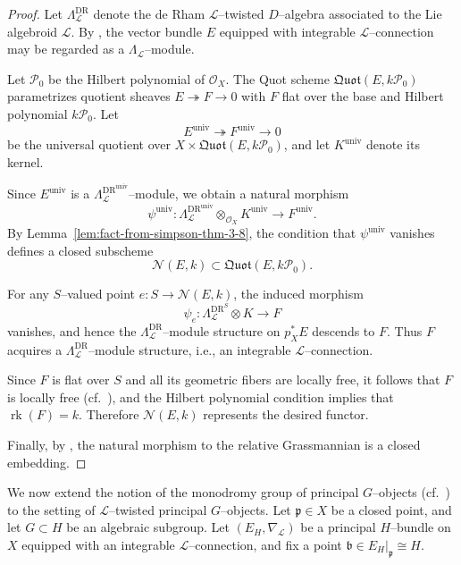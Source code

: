 \documentclass[12pt,reqno]{amsart}
\numberwithin{equation}{subsection}
\theoremstyle{definition}
\theoremstyle{theorem}
\begin{document}
\begin{proof}
	Let $\Lambda^{\text{DR}}_{\mathcal L}$ denote the de Rham $\mathcal{L}$--twisted $D$--algebra associated to the Lie algebroid
	$\mathcal L$.
	By \cite[\S\, Ch.4. Prop. 38]{P.Tortella-2011T},
	the vector bundle $E$ equipped with integrable $\mathcal{L}$--connection may be regarded as a $\Lambda_{\mathcal L}$--module.
	
	Let $\mathcal P_0$ be the Hilbert polynomial of $\mathcal O_X$.
	The Quot scheme $\mathfrak{Quot}(E,k\mathcal P_0)$
	parametrizes quotient sheaves $E\twoheadrightarrow F\to 0$
	with $F$ flat over the base and Hilbert polynomial $k\mathcal P_0$.
	Let
	\[
	E^{\mathrm{univ}} \twoheadrightarrow F^{\mathrm{univ}} \to 0
	\]
	be the universal quotient over
	$X\times \mathfrak{Quot}(E,k\mathcal P_0)$,
	and let $K^{\mathrm{univ}}$ denote its kernel.
	
	Since $E^{\mathrm{univ}}$ is a $\Lambda^{\text{DR}^{\text{univ}}}_{\mathcal L}$--module,
	we obtain a natural morphism
	\[
	\psi^{\mathrm{univ}} :
	\Lambda^{\text{DR}^{\text{univ}}}_{\mathcal L}
	\otimes_{\mathcal O_X} K^{\mathrm{univ}}
	\longrightarrow F^{\mathrm{univ}}.
	\]
	By Lemma~\eqref{lem:fact-from-simpson-thm-3-8},
	the condition that $\psi^{\mathrm{univ}}$ vanishes defines a closed
	subscheme
	\[
	\mathcal{N}(E,k) \subset \mathfrak{Quot}(E,k\mathcal P_0).
	\]
	
	For any $S$--valued point
	$e:S\to \mathcal{N}(E,k)$,
	the induced morphism
	\[
	\psi_e :
	\Lambda^{\text{DR}^{S}}_{\mathcal L} \otimes K \to F
	\]
	vanishes, and hence the $\Lambda^{\text{DR}}_{\mathcal L}$--module structure on $p_X^*E$ descends to $F$.
	Thus $F$ acquires a $\Lambda^{\text{DR}}_{\mathcal L}$--module structure, i.e.,
	an integrable $\mathcal L$--connection.
	
	Since $F$ is flat over $S$ and all its geometric fibers are locally free,
	it follows that $F$ is locally free
	(cf.~\cite[\S\,1, Lemma~1.27]{CT.Simpson-1994}), and the Hilbert polynomial condition implies that $\operatorname{rk}(F)=k$.
	Therefore $\mathcal{N}(E,k)$ represents the desired functor.
	
	Finally, by
	\cite[\S\,4, Lemma~4.9]{CT.Simpson-1994},
	the natural morphism to the relative Grassmannian is a closed embedding.
\end{proof}


We now extend the notion of the monodromy group of principal $G$--objects
(cf.~\cite[\S\,9, p.~50]{CT.Simpson-1995}) to the setting of
$\mathcal{L}$--twisted principal $G$--objects.
Let $\mathfrak{p}\in X$ be a closed point, and let $G\subset H$ be an
algebraic subgroup.
Let $(E_H,\nabla_{\mathcal L})$ be a principal $H$--bundle on $X$ equipped
with an integrable $\mathcal{L}$--connection, and fix a point
$\mathfrak{b}\in E_H|_{\mathfrak{p}}\cong H$.
\end{document}
